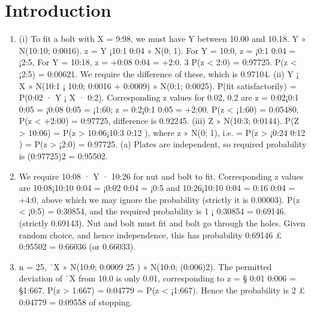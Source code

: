 \documentclass{article}
\begin{document}
\section{Introduction}
\begin{enumerate}
\item (i) To fit a bolt with X = 9:98, we must have Y between 10.00 and 10.18.
Y » N(10:10; 0:0016). z = Y ¡10:1
0:04 » N(0; 1).
For Y = 10:0, z = ¡0:1
0:04 = ¡2:5,
For Y = 10:18, z = +0:08
0:04 = +2:0.
3
P(z < 2:0) = 0:97725. P(z < ¡2:5) = 0:00621.
We require the difference of these, which is 0.97104.
(ii) Y ¡ X » N(10:1 ¡ 10:0; 0:0016 + 0:0009) » N(0:1; 0:0025).
P(fit satisfactorily) = P(0:02 · Y ¡ X · 0:2). Corresponding z values for
0.02, 0.2 are z = 0:02¡0:1
0:05 = ¡0:08
0:05 = ¡1:60; z = 0:2¡0:1
0:05 = +2:00.
P(z < ¡1:60) = 0:05480, P(z < +2:00) = 0:97725, difference is 0.92245.
(iii) Z » N(10:3; 0:0144). P(Z > 10:06) = P(z > 10:06¡10:3
0:12 ), where z » N(0; 1),
i.e. = P(z > ¡0:24
0:12 ) = P(z > ¡2:0) = 0:97725.
(a) Plates are independent, so required probability is (0:97725)2 = 0:95502.
\item We require 10:08 · Y · 10:26 for nut and bolt to fit. Corresponding z values
are 10:08¡10:10
0:04 = ¡0:02
0:04 = ¡0:5 and 10:26¡10:10
0:04 = 0:16
0:04 = +4:0, above which we
may ignore the probability (strictly it is 0.00003). P(z < ¡0:5) = 0:30854,
and the required probability is 1 ¡ 0:30854 = 0:69146. (strictly 0.69143).
Nut and bolt must fit and bolt go through the holes. Given random choice,
and hence independence, this has probability 0:69146 £ 0:95502 = 0:66036
(or 0.66033).
\item n = 25, ¯X » N(10:0; 0:0009
25 ) » N(10:0; (0:006)2).
The permitted deviation of ¯X from 10.0 is only 0.01, corresponding to
z = § 0:01
0:006 = §1:667. P(z > 1:667) = 0:04779 = P(z < ¡1:667).
Hence the probability is 2 £ 0:04779 = 0:09558 of stopping.
\end{enumerate}
\end{document}
